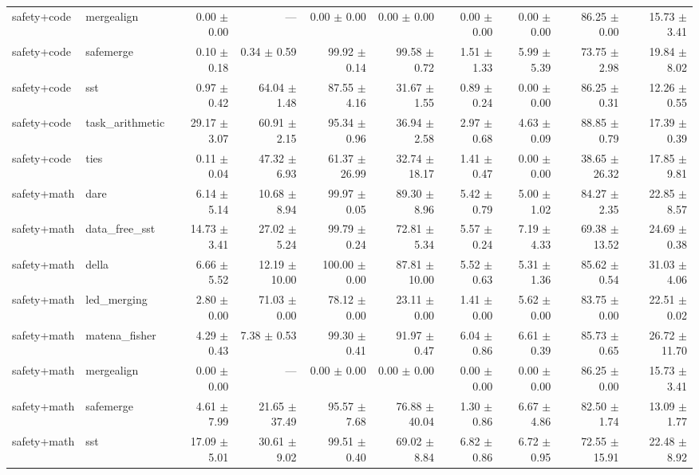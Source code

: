 \documentclass{article}
\begin{document}
\begin{table}[H]
{\begin{tabular}{llrrrrrrrr}
safety+code & mergealign & 0.00 $\pm$ 0.00 & --- & 0.00 $\pm$ 0.00 & 0.00 $\pm$ 0.00 & 0.00 $\pm$ 0.00 & 0.00 $\pm$ 0.00 & 86.25 $\pm$ 0.00 & 15.73 $\pm$ 3.41 \\
safety+code & safemerge & 0.10 $\pm$ 0.18 & 0.34 $\pm$ 0.59 & 99.92 $\pm$ 0.14 & 99.58 $\pm$ 0.72 & 1.51 $\pm$ 1.33 & 5.99 $\pm$ 5.39 & 73.75 $\pm$ 2.98 & 19.84 $\pm$ 8.02 \\
safety+code & sst & 0.97 $\pm$ 0.42 & 64.04 $\pm$ 1.48 & 87.55 $\pm$ 4.16 & 31.67 $\pm$ 1.55 & 0.89 $\pm$ 0.24 & 0.00 $\pm$ 0.00 & 86.25 $\pm$ 0.31 & 12.26 $\pm$ 0.55 \\
safety+code & task\_arithmetic & 29.17 $\pm$ 3.07 & 60.91 $\pm$ 2.15 & 95.34 $\pm$ 0.96 & 36.94 $\pm$ 2.58 & 2.97 $\pm$ 0.68 & 4.63 $\pm$ 0.09 & 88.85 $\pm$ 0.79 & 17.39 $\pm$ 0.39 \\
safety+code & ties & 0.11 $\pm$ 0.04 & 47.32 $\pm$ 6.93 & 61.37 $\pm$ 26.99 & 32.74 $\pm$ 18.17 & 1.41 $\pm$ 0.47 & 0.00 $\pm$ 0.00 & 38.65 $\pm$ 26.32 & 17.85 $\pm$ 9.81 \\
safety+math & dare & 6.14 $\pm$ 5.14 & 10.68 $\pm$ 8.94 & 99.97 $\pm$ 0.05 & 89.30 $\pm$ 8.96 & 5.42 $\pm$ 0.79 & 5.00 $\pm$ 1.02 & 84.27 $\pm$ 2.35 & 22.85 $\pm$ 8.57 \\
safety+math & data\_free\_sst & 14.73 $\pm$ 3.41 & 27.02 $\pm$ 5.24 & 99.79 $\pm$ 0.24 & 72.81 $\pm$ 5.34 & 5.57 $\pm$ 0.24 & 7.19 $\pm$ 4.33 & 69.38 $\pm$ 13.52 & 24.69 $\pm$ 0.38 \\
safety+math & della & 6.66 $\pm$ 5.52 & 12.19 $\pm$ 10.00 & 100.00 $\pm$ 0.00 & 87.81 $\pm$ 10.00 & 5.52 $\pm$ 0.63 & 5.31 $\pm$ 1.36 & 85.62 $\pm$ 0.54 & 31.03 $\pm$ 4.06 \\
safety+math & led\_merging & 2.80 $\pm$ 0.00 & 71.03 $\pm$ 0.00 & 78.12 $\pm$ 0.00 & 23.11 $\pm$ 0.00 & 1.41 $\pm$ 0.00 & 5.62 $\pm$ 0.00 & 83.75 $\pm$ 0.00 & 22.51 $\pm$ 0.02 \\
safety+math & matena\_fisher & 4.29 $\pm$ 0.43 & 7.38 $\pm$ 0.53 & 99.30 $\pm$ 0.41 & 91.97 $\pm$ 0.47 & 6.04 $\pm$ 0.86 & 6.61 $\pm$ 0.39 & 85.73 $\pm$ 0.65 & 26.72 $\pm$ 11.70 \\
safety+math & mergealign & 0.00 $\pm$ 0.00 & --- & 0.00 $\pm$ 0.00 & 0.00 $\pm$ 0.00 & 0.00 $\pm$ 0.00 & 0.00 $\pm$ 0.00 & 86.25 $\pm$ 0.00 & 15.73 $\pm$ 3.41 \\
safety+math & safemerge & 4.61 $\pm$ 7.99 & 21.65 $\pm$ 37.49 & 95.57 $\pm$ 7.68 & 76.88 $\pm$ 40.04 & 1.30 $\pm$ 0.86 & 6.67 $\pm$ 4.86 & 82.50 $\pm$ 1.74 & 13.09 $\pm$ 1.77 \\
safety+math & sst & 17.09 $\pm$ 5.01 & 30.61 $\pm$ 9.02 & 99.51 $\pm$ 0.40 & 69.02 $\pm$ 8.84 & 6.82 $\pm$ 0.86 & 6.72 $\pm$ 0.95 & 72.55 $\pm$ 15.91 & 22.48 $\pm$ 8.92 \\

\end{tabular}}
\end{table}
\end{document}
